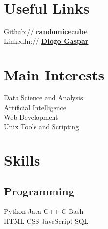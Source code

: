 \documentclass[]{deedy-resume-openfont}
\begin{document}
%
%
\lastupdated

%
%

%
%

\begin{minipage}[t]{0.33\textwidth}


  \section{Useful Links}
  Github:// \href{https://github.com/randomicecube}{\bf randomicecube} \\
  LinkedIn://  \href{https://www.linkedin.com/in/diogo-gaspar-74142821b/}{\bf Diogo Gaspar}


  \section{Main Interests}
  Data Science and Analysis \\
  Artificial Intelligence \\
  Web Development\\
  Unix Tools and Scripting


  \section{Skills}
  \subsection{Programming}
  Python \textbullet{} Java \textbullet{} C++ \textbullet{} C \textbullet{} Bash\\
  HTML \textbullet{} CSS \textbullet{} JavaScript \textbullet{} SQL
  \sectionsep


\end{minipage}
\end{document}

